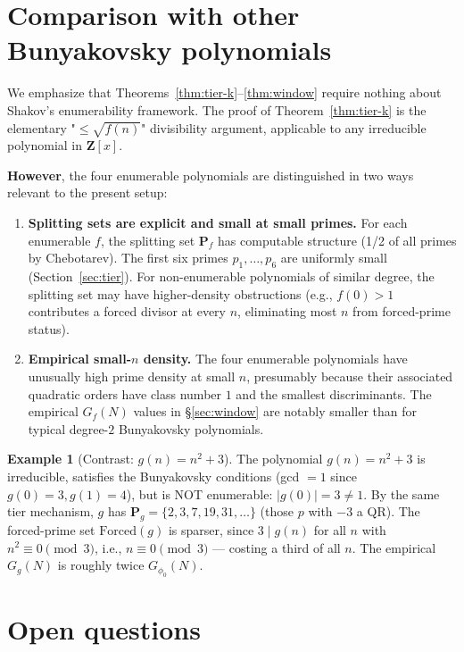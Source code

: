 \documentclass[11pt]{article}
\theoremstyle{definition}
\newtheorem{example}[theorem]{Example}
\newcommand{\Z}{\mathbf{Z}}
\newcommand{\PP}{\mathbf{P}}
\newcommand{\Forced}{\mathrm{Forced}}
\begin{document}
\section{Comparison with other Bunyakovsky polynomials}\label{sec:comparison}

We emphasize that Theorems~\ref{thm:tier-k}–\ref{thm:window} require nothing about Shakov's enumerability framework. The proof of Theorem~\ref{thm:tier-k} is the elementary "$\le \sqrt{f(n)}$" divisibility argument, applicable to any irreducible polynomial in $\Z[x]$.

\textbf{However}, the four enumerable polynomials are distinguished in two ways relevant to the present setup:

\begin{enumerate}
\item \textbf{Splitting sets are explicit and small at small primes.} For each enumerable $f$, the splitting set $\PP_f$ has computable structure (1/2 of all primes by Chebotarev). The first six primes $p_1, \ldots, p_6$ are uniformly small (Section~\ref{sec:tier}). For non-enumerable polynomials of similar degree, the splitting set may have higher-density obstructions (e.g., $f(0) > 1$ contributes a forced divisor at every $n$, eliminating most $n$ from forced-prime status).

\item \textbf{Empirical small-$n$ density.} The four enumerable polynomials have unusually high prime density at small $n$, presumably because their associated quadratic orders have class number $1$ and the smallest discriminants. The empirical $G_f(N)$ values in §\ref{sec:window} are notably smaller than for typical degree-$2$ Bunyakovsky polynomials.
\end{enumerate}

\begin{example}[Contrast: $g(n) = n^2 + 3$]\label{ex:not-enumerable}
The polynomial $g(n) = n^2 + 3$ is irreducible, satisfies the Bunyakovsky conditions (gcd $= 1$ since $g(0) = 3, g(1) = 4$), but is NOT enumerable: $|g(0)| = 3 \ne 1$. By the same tier mechanism, $g$ has $\PP_g = \{2, 3, 7, 19, 31, \ldots\}$ (those $p$ with $-3$ a QR). The forced-prime set $\Forced(g)$ is sparser, since $3 \mid g(n)$ for all $n$ with $n^2 \equiv 0 \pmod 3$, i.e., $n \equiv 0 \pmod 3$ — costing a third of all $n$. The empirical $G_g(N)$ is roughly twice $G_{\phi_0}(N)$.
\end{example}

\section{Open questions}\label{sec:open}
\end{document}
